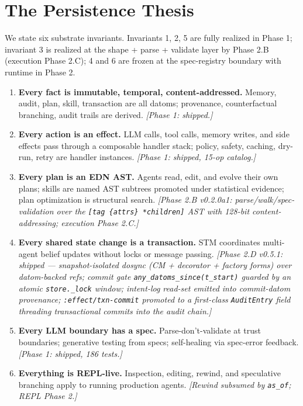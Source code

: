 \documentclass[anon]{nesy2026}   %
\newcommand{\C}[1]{\texttt{#1}}
\begin{document}
\section{The Persistence Thesis}\label{sec:thesis}

We state six substrate invariants. Invariants 1, 2, 5 are fully realized in Phase 1; invariant 3 is realized at the shape + parse + validate layer by Phase 2.B (execution Phase 2.C); 4 and 6 are frozen at the spec-registry boundary with runtime in Phase 2.

\begin{enumerate}
\item \textbf{Every fact is immutable, temporal, content-addressed.} Memory, audit, plan, skill, transaction are all datoms; provenance, counterfactual branching, audit trails are derived. \emph{[Phase 1: shipped.]}
\item \textbf{Every action is an effect.} LLM calls, tool calls, memory writes, and side effects pass through a composable handler stack; policy, safety, caching, dry-run, retry are handler instances. \emph{[Phase 1: shipped, 15-op catalog.]}
\item \textbf{Every plan is an EDN AST.} Agents read, edit, and evolve their own plans; skills are named AST subtrees promoted under statistical evidence; plan optimization is structural search. \emph{[Phase 2.B v0.2.0a1: parse/walk/spec-validation over the \C{[tag \{attrs\} *children]} AST with 128-bit content-addressing; execution Phase 2.C.]}
\item \textbf{Every shared state change is a transaction.} STM coordinates multi-agent belief updates without locks or message passing. \emph{[Phase 2.D v0.5.1: shipped --- snapshot-isolated dosync (CM + decorator + factory forms) over datom-backed refs; commit gate \C{any\_datoms\_since(t\_start)} guarded by an atomic \C{store.\_lock} window; intent-log read-set emitted into commit-datom provenance; \C{:effect/txn-commit} promoted to a first-class \C{AuditEntry} field threading transactional commits into the audit chain.]}
\item \textbf{Every LLM boundary has a spec.} Parse-don't-validate at trust boundaries; generative testing from specs; self-healing via spec-error feedback. \emph{[Phase 1: shipped, 186 tests.]}
\item \textbf{Everything is REPL-live.} Inspection, editing, rewind, and speculative branching apply to running production agents. \emph{[Rewind subsumed by \C{as\_of}; REPL Phase 2.]}
\end{enumerate}
\end{document}
